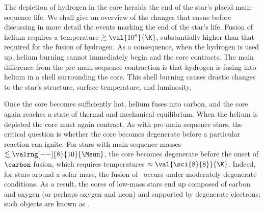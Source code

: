 
The depletion of hydrogen in the core heralds the end of the star's placid main-sequence life. We shall give an overview of the changes that ensue before discussing in more detail the events marking the end of the star's life. Fusion of helium requires a temperature $\gtrsim\val{10^{8}}{\K}$, substantially higher than that required for the fusion of hydrogen. As a consequence, when the hydrogen is used up, helium burning cannot immediately begin and the core contracts. The main difference from the pre-main-sequence contraction is that hydrogen is fusing into helium in a shell surrounding the core. This shell burning causes drastic changes to the star's structure, surface temperature, and luminosity.

Once the core becomes sufficiently hot, helium fuses into carbon, and the core again reaches a state of thermal and mechanical equilibrium. When the helium is depleted the core must again contract. As with pre-main sequence stars, the critical question is whether the core becomes degenerate before a particular reaction can ignite. For stars with main-sequence masses $\lesssim \valrng[--]{8}{10}{\Msun}$, the core becomes degenerate before the onset of $\carbon$ fusion, which requires temperatures $\approx\val{\sci{8}{8}}{\K}$.  Indeed, for stars around a solar mass, the fusion of \helium\ occurs under moderately degenerate conditions.
As a result, the cores of low-mass stars end up composed of carbon and oxygen (or perhaps oxygen and neon) and supported by degenerate electrons; such objects are known as .

